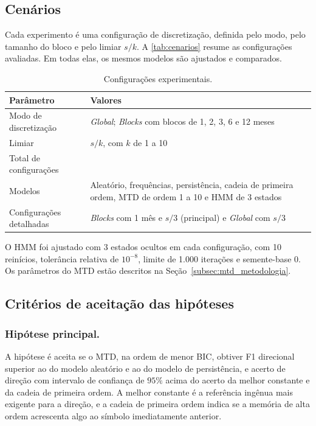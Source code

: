 \documentclass[
    12pt,                %
    openright,           %
    oneside,             %
    a4paper,             %
    english,             %
    brazil               %
]{abntex2}
\begin{document}
\subsection{Cenários}
\label{sec:cenarios}

Cada experimento é uma configuração de discretização, definida pelo modo, pelo tamanho do bloco e pelo limiar $s/k$. A \autoref{tab:cenarios} resume as 
configurações avaliadas. Em todas elas, os mesmos modelos são ajustados e comparados.

\begin{table}[htbp]
    \centering
    \caption{Configurações experimentais.}
    \label{tab:cenarios}
    \small
    \begin{tabular}{@{}>{\raggedright\arraybackslash}p{}>{\raggedright\arraybackslash}p{}@{}}
        \toprule
        \textbf{Parâmetro} & \textbf{Valores} \\
        \midrule
        Modo de discretização & \textit{Global}; \textit{Blocks} com blocos de 1, 2, 3, 6 e 12 meses \\
        Limiar & $s/k$, com $k$ de 1 a 10 \\
        Total de configurações & 60 \\
        Modelos & Aleatório, frequências, persistência, cadeia de primeira ordem, MTD de ordem 1 a 10 e HMM de 3 estados \\
        Configurações detalhadas & \textit{Blocks} com 1 mês e $s/3$ (principal) e \textit{Global} com $s/3$ \\
        \bottomrule
    \end{tabular}
\end{table}

O HMM foi ajustado com 3 estados ocultos em cada configuração, com 10 reinícios, tolerância relativa de $10^{-8}$, limite de 1.000 iterações e semente-base 0. 
Os parâmetros do MTD estão descritos na Seção~\ref{subsec:mtd_metodologia}.

\subsection{Critérios de aceitação das hipóteses}
\label{sec:criterios}

\subsubsection{Hipótese principal.} A hipótese é aceita se o MTD, na ordem de menor BIC, obtiver F1 direcional 
superior ao do modelo aleatório e ao do modelo de persistência, e acerto de direção com intervalo de confiança 
de $95\%$ acima do acerto da melhor constante e da cadeia de primeira ordem. A melhor constante é a referência 
ingênua mais exigente para a direção, e a cadeia de primeira ordem indica se a memória de alta ordem acrescenta 
algo ao símbolo imediatamente anterior.
\end{document}
